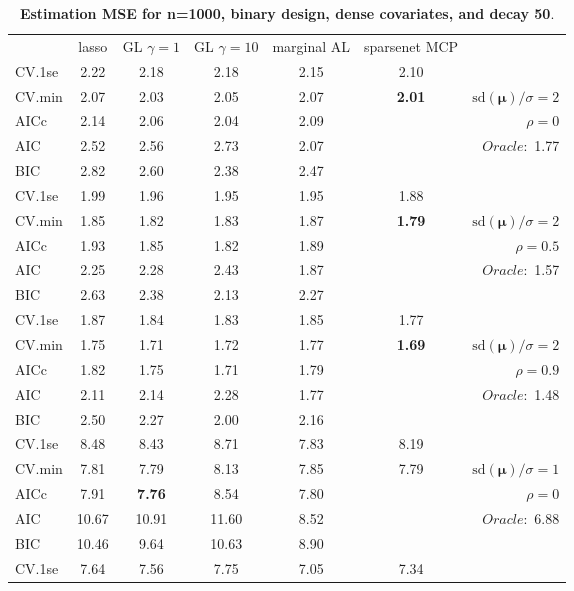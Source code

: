 \clearpage
\begin{table}\vspace{-.5cm}
\caption[l]{ { \bf Estimation MSE for n=1000, binary design, 
dense covariates, and  decay  50}.}
\vspace{-.5cm}
\footnotesize{}
\begin{center}
\begin{tabular}{l*{5}{c}|r}
& lasso & GL $\gamma=1$ & GL $\gamma=10$ & marginal AL & sparsenet MCP  & \\
 \cline{1-7}
CV.1se & 2.22 & 2.18 & 2.18 & 2.15 & 2.10 & \\
CV.min & 2.07 & 2.03 & 2.05 & 2.07 & {\bf 2.01} &  $\mathrm{sd}(\mathbf{\mu})/\sigma=2$ \\
AICc & 2.14 & 2.06 & 2.04 & 2.09 & & $\rho=0$ \\
AIC & 2.52 & 2.56 & 2.73 & 2.07 & &  \multirow{2}{*}{$Oracle: $ 1.77} \\
BIC & 2.82 & 2.60 & 2.38 & 2.47 & &  \\
 \hline 
CV.1se & 1.99 & 1.96 & 1.95 & 1.95 & 1.88 & \\
CV.min & 1.85 & 1.82 & 1.83 & 1.87 & {\bf 1.79} &  $\mathrm{sd}(\mathbf{\mu})/\sigma=2$ \\
AICc & 1.93 & 1.85 & 1.82 & 1.89 & & $\rho=0.5$ \\
AIC & 2.25 & 2.28 & 2.43 & 1.87 & &  \multirow{2}{*}{$Oracle: $ 1.57} \\
BIC & 2.63 & 2.38 & 2.13 & 2.27 & &  \\
 \hline 
CV.1se & 1.87 & 1.84 & 1.83 & 1.85 & 1.77 & \\
CV.min & 1.75 & 1.71 & 1.72 & 1.77 & {\bf 1.69} &  $\mathrm{sd}(\mathbf{\mu})/\sigma=2$ \\
AICc & 1.82 & 1.75 & 1.71 & 1.79 & & $\rho=0.9$ \\
AIC & 2.11 & 2.14 & 2.28 & 1.77 & &  \multirow{2}{*}{$Oracle: $ 1.48} \\
BIC & 2.50 & 2.27 & 2.00 & 2.16 & &  \\
 \hline 
CV.1se & 8.48 & 8.43 & 8.71 & 7.83 & 8.19 & \\
CV.min & 7.81 & 7.79 & 8.13 & 7.85 & 7.79 &  $\mathrm{sd}(\mathbf{\mu})/\sigma=1$ \\
AICc & 7.91 & {\bf 7.76} & 8.54 & 7.80 & & $\rho=0$ \\
AIC & 10.67 & 10.91 & 11.60 & 8.52 & &  \multirow{2}{*}{$Oracle: $ 6.88} \\
BIC & 10.46 & 9.64 & 10.63 & 8.90 & &  \\
 \hline 
CV.1se & 7.64 & 7.56 & 7.75 & 7.05 & 7.34 & \\

\end{tabular}
\end{center}
\end{table}
